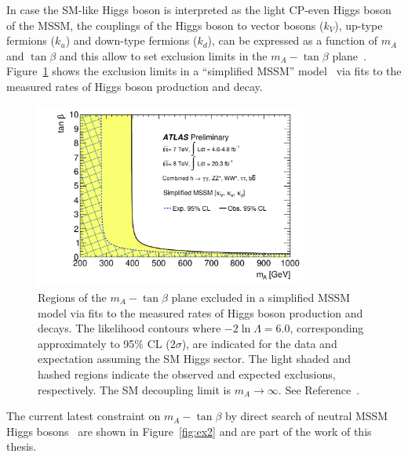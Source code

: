 In case the SM-like Higgs boson is interpreted as the light CP-even Higgs boson of the MSSM, the couplings of the Higgs boson 
to vector bosons ($k_V$), up-type fermions ($k_u$) and down-type fermions ($k_d$), can be expressed as a function of  $m_A $ and $\tan\beta$ 
and this allow to set exclusion limits in the $m_A - \tan\beta$ plane~\cite{AtlasConstraint}. Figure~\ref{fig:ex1} shows the exclusion limits in a 
``simplified MSSM'' model~\cite{sympleMSSM1,sympleMSSM2} via fits to the measured rates of Higgs boson production and decay.

 
\begin{figure}[tp]
     \begin{center}

            \includegraphics[width=0.8\textwidth]{figure/limits/constraintAtlas.pdf}

    \end{center}
    \caption{Regions of the  $m_A - \tan\beta$ plane excluded in a simplified MSSM model via fits to the measured
rates of Higgs boson production and decays. The likelihood contours where $−2 \ln \Lambda = 6.0$, corresponding
approximately to 95\% CL ($2\sigma$), are indicated for the data and expectation assuming the SM Higgs sector.
The light shaded and hashed regions indicate the observed and expected exclusions, respectively. The
SM decoupling limit is $m_A \rightarrow \infty$. See Reference~\cite{AtlasConstraint}.}

   \label{fig:ex1}
\end{figure}


The current latest constraint on $m_A - \tan\beta$  by direct search of neutral MSSM Higgs bosons~\cite{} are  shown in Figure~\ref{fig:ex2}
and are part of the work of this thesis.



